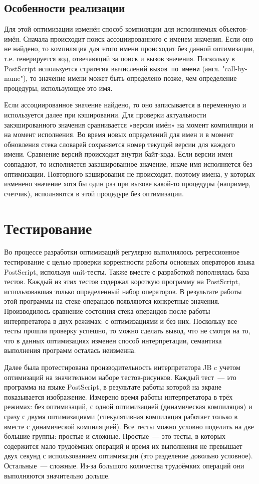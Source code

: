 	\subsection{Особенности реализации}
	Для этой оптимизации изменён способ компиляции для исполняемых объектов-имён. Сначала происходит поиск ассоциированного с именем значения. Если оно не найдено, то компиляция для этого имени происходит без данной оптимизации, т.е. генерируется код, отвечающий за поиск и вызов значения. Поскольку в PostScript используется стратегия вычислений \texttt{вызов по имени} (англ. "call-by-name"), то значение имени может быть определено позже, чем определение процедуры, использующее это имя.
	
	Если ассоциированное значение найдено, то оно записывается в переменную и используется далее при кэшировании.
	Для проверки актуальности закэшированного значения сравнивается «версии имён» на момент компиляции и на момент исполнения. Во время новых определений для имен и в момент обновления стека словарей сохраняется номер текущей версии для каждого имени. Сравнение версий происходит внутри байт-кода. Если версии имен совпадают, то исполняется закэшированное значение, иначе имя исполняется без оптимизации. Повторного кэширования не происходит, поэтому имена, у которых изменено значение хотя бы один раз при вызове какой-то процедуры (например, счетчик), исполняются в этой процедуре без оптимизации. 

	
	
	\section{Тестирование}
	Во процессе разработки оптимизаций регулярно выполнялось регрессионное тестирование с целью проверки корректности работы основных операторов языка PostScript, используя unit-тесты. Также вместе с разработкой пополнялась база тестов. Каждый из этих тестов содержал короткую программу на PostScript, использовавшая только определенный набор операторов. В результате работы этой программы на стеке операндов появляются конкретные значения. Производилось сравнение состояния стека операндов после работы интерпретатора в двух режимах: с оптимизациями и без них. Поскольку все тесты прошли проверку успешно, то можно сделать вывод, что не смотря на то, что в данных оптимизациях изменен способ интерпретации, семантика выполнения программ осталась неизменна.
	
	Далее была протестирована производительность интерпретатора JB c учетом оптимизаций на значительном наборе тестов-рисунков.	Каждый тест~--- это программа на языке PostScript, в результате работы которой на экране показывается изображение. Измерено время работы интерпретатора в трёх режимах: без оптимизаций, с одной оптимизацией (динамическая компиляция) и сразу с двумя оптимизациями (спекулятивная компиляция работает только в вместе с динамической компиляцией). Все тесты можно условно поделить на две большие группы: простые и сложные. Простые~--- это тесты, в которых содержится мало трудоёмких операций и время их выполнения не превышает двух секунд с использованием оптимизации (это разделение довольно условное). Остальные~--- сложные. Из-за большого количества трудоёмких операций они выполняются значительно дольше.
	
